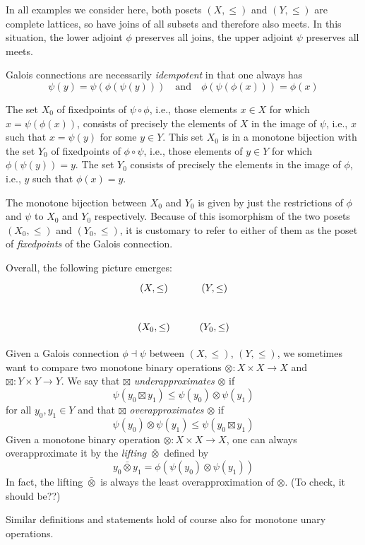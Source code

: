 \documentclass{llncs}
\begin{document}
In all examples we consider here, both posets $(X, \leq)$ and
$(Y, \leq)$ are complete lattices, so have joins of all subsets and
therefore also meets. In this situation, the lower adjoint $\phi$
preserves all joins, the upper adjoint $\psi$ preserves all meets.

Galois connections are necessarily \emph{idempotent} in that one
always has
\[
\psi(y) = \psi(\phi(\psi(y))) \quad \mathrm{and} \quad \phi(\psi(\phi(x))) = \phi(x)
\]  

The set $X_0$ of fixedpoints of $\psi \circ \phi$, i.e., those
elements $x \in X$ for which $x = \psi(\phi(x))$, consists of
precisely the elements of $X$ in the image of $\psi$, i.e., $x$ such
that $x = \psi(y)$ for some $y \in Y$. This set $X_0$ is in a monotone
bijection with the set $Y_0$ of fixedpoints of $\phi \circ \psi$,
i.e., those elements of $y \in Y$ for which $\phi(\psi(y)) = y$. The
set $Y_0$ consists of precisely the elements in the image of $\phi$,
i.e., $y$ such that $\phi(x) = y$.

The monotone bijection between $X_0$ and $Y_0$ is given by just the
restrictions of $\phi$ and $\psi$ to $X_0$ and $Y_0$
respectively. Because of this isomorphism of the two posets
$(X_0, \leq)$ and $(Y_0, \leq)$, it is customary to refer to either of
them as the poset of \emph{fixedpoints} of the Galois connection.

Overall, the following picture emerges:
\[
\xymatrix{
(X, \leq)
& (Y, \leq) \\   
(X_0, \leq)
& (Y_0, \leq)
}  
\]

Given a Galois connection $\phi \dashv \psi$ between $(X, \leq)$,
$(Y, \leq)$, we sometimes want to compare two monotone binary
operations ${\otimes} : X \times X \to X$ and
${\boxtimes} : Y \times Y \to Y$. We say that $\boxtimes$
\emph{underapproximates} $\otimes$ if
\[
\psi(y_0 \boxtimes y_1) \leq \psi(y_0) \otimes \psi(y_1) 
\]  
for all $y_0, y_1 \in Y$ and that $\boxtimes$ \emph{overapproximates}
$\otimes$ if
\[
\psi(y_0) \otimes \psi(y_1) \leq \psi(y_0 \boxtimes y_1) 
\]  
Given a monotone binary operation $\otimes : X \times X \to X$, one
can always overapproximate it by the \emph{lifting} $\bar{\otimes}$
defined by
\[
y_0 \mathbin{\bar{\otimes}} y_1 = \phi(\psi(y_0) \otimes \psi(y_1)) 
\]
In fact, the lifting $\bar{\otimes}$ is always the least
overapproximation of $\otimes$. (To check, it should be??)

Similar definitions and statements hold of course also for monotone
unary operations.
\end{document}

